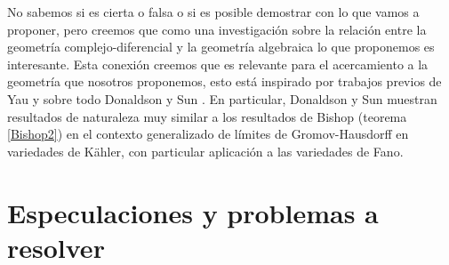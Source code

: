 \documentclass{article}
\begin{document}
\noindent No sabemos si es cierta o falsa o si es posible demostrar con lo que vamos a proponer, pero creemos que como una 
investigaci\'on sobre la relaci\'on entre la geometr\'ia complejo-diferencial y la geometr\'ia algebraica lo que proponemos es interesante.
Esta conexi\'on creemos que es relevante para el acercamiento a la geometr\'ia que nosotros proponemos, esto est\'a inspirado por trabajos 
previos de Yau \cite{S-Yau} y sobre todo Donaldson y Sun \cite{D-SS}. En particular, Donaldson y Sun muestran resultados de naturaleza muy similar 
a los resultados de Bishop (teorema \ref{Bishop2}) en el contexto generalizado de l\'imites de Gromov-Hausdorff en variedades de 
K\"ahler, con particular aplicaci\'on a las variedades de Fano.

\section{Especulaciones y problemas a resolver}
\end{document}
